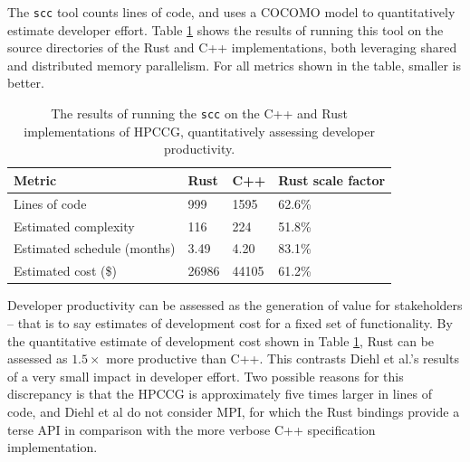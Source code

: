The \texttt{scc} tool counts lines of code, and uses a COCOMO model to quantitatively estimate developer effort. Table \ref{tab:scc-language-comparison} shows the results of running this tool on the source directories of the Rust and C++ implementations, both leveraging shared and distributed memory parallelism. For all metrics shown in the table, smaller is better.

\begin{table}[H]
    \centering
    \caption{The results of running the \texttt{scc} on the C++ and Rust implementations of HPCCG, quantitatively assessing developer productivity.}
    \label{tab:scc-language-comparison}
    \begin{tabular}{|l||l|l|l|}
    \hline
    \textbf{Metric}             & \textbf{Rust} & \textbf{C++} & \textbf{Rust scale factor} \\ \hline\hline
    Lines of code               & 999           & 1595         & 62.6\%                     \\ \hline
    Estimated complexity        & 116           & 224          & 51.8\%                     \\ \hline
    Estimated schedule (months) & 3.49          & 4.20         & 83.1\%                     \\ \hline
    Estimated cost (\$)         & 26986         & 44105        & 61.2\%                     \\ \hline
    \end{tabular}
\end{table}


Developer productivity can be assessed as the generation of value for stakeholders -- that is to say estimates of development cost for a fixed set of functionality. By the quantitative estimate of development cost shown in Table \ref{tab:scc-language-comparison}, Rust can be assessed as $1.5 \times$ more productive than C++. This contrasts Diehl et al.'s results of a very small impact in developer effort. Two possible reasons for this discrepancy is that the HPCCG is approximately five times larger in lines of code, and Diehl et al do not consider MPI, for which the Rust bindings provide a terse API in comparison with the more verbose C++ specification implementation.

